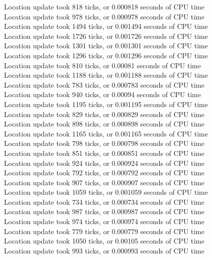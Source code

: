 \documentclass[12pt,a4paper]{article}
\begin{document}
{    Location update took 818 ticks, or 0.000818 seconds of CPU time\\
    Location update took 978 ticks, or 0.000978 seconds of CPU time\\
    Location update took 1494 ticks, or 0.001494 seconds of CPU time\\
    Location update took 1726 ticks, or 0.001726 seconds of CPU time\\
    Location update took 1301 ticks, or 0.001301 seconds of CPU time\\
    Location update took 1296 ticks, or 0.001296 seconds of CPU time\\
    Location update took 810 ticks, or 0.00081 seconds of CPU time\\
    Location update took 1188 ticks, or 0.001188 seconds of CPU time\\
    Location update took 783 ticks, or 0.000783 seconds of CPU time\\
    Location update took 940 ticks, or 0.00094 seconds of CPU time\\
    Location update took 1195 ticks, or 0.001195 seconds of CPU time\\
    Location update took 829 ticks, or 0.000829 seconds of CPU time\\
    Location update took 898 ticks, or 0.000898 seconds of CPU time\\
    Location update took 1165 ticks, or 0.001165 seconds of CPU time\\
    Location update took 798 ticks, or 0.000798 seconds of CPU time\\
    Location update took 851 ticks, or 0.000851 seconds of CPU time\\
    Location update took 924 ticks, or 0.000924 seconds of CPU time\\
    Location update took 792 ticks, or 0.000792 seconds of CPU time\\
    Location update took 907 ticks, or 0.000907 seconds of CPU time\\
    Location update took 1059 ticks, or 0.001059 seconds of CPU time\\
    Location update took 734 ticks, or 0.000734 seconds of CPU time\\
    Location update took 987 ticks, or 0.000987 seconds of CPU time\\
    Location update took 974 ticks, or 0.000974 seconds of CPU time\\
    Location update took 779 ticks, or 0.000779 seconds of CPU time\\
    Location update took 1050 ticks, or 0.00105 seconds of CPU time\\
    Location update took 993 ticks, or 0.000993 seconds of CPU time
    }
	
\end{document}

